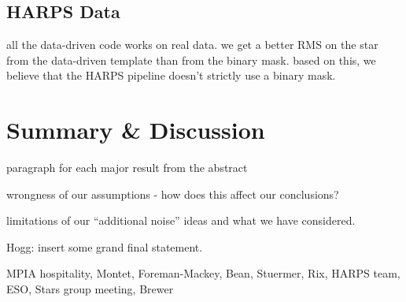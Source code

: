 \documentclass[modern]{aastex61}
\begin{document}
\subsection{HARPS Data}

all the data-driven code works on real data. we get a better RMS on the star from the data-driven template than from the binary mask. based on this, we believe that the HARPS pipeline doesn't strictly use a binary mask.

\section{Summary \& Discussion}
\label{s:summary}

paragraph for each major result from the abstract

wrongness of our assumptions - how does this affect our conclusions?

limitations of our ``additional noise'' ideas and what we have considered.

Hogg: insert some grand final statement.

\acknowledgements
MPIA hospitality, Montet, Foreman-Mackey, Bean, Stuermer, Rix, HARPS team, ESO, Stars group meeting, Brewer


\end{document}
